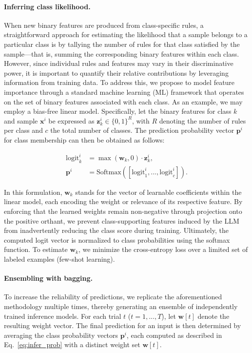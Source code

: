 \paragraph{Inferring class likelihood.} When new binary features are produced from class-specific rules, a straightforward approach for estimating the likelihood that a sample belongs to a particular class is by tallying the number of rules for that class satisfied by the sample—that is, summing the corresponding binary features within each class. However, since individual rules and features may vary in their discriminative power, it is important to quantify their relative contributions by leveraging information from training data. To address this, we propose to model feature importance through a standard machine learning (ML) framework that operates on the set of binary features associated with each class. As an example, we may employ a bias-free linear model. Specifically, let the binary features for class $k$ and sample $\mathbf{x}^i$ be expressed as $\mathbf{z}_k^i \in \{0, 1\}^R$, with $R$ denoting the number of rules per class and $c$ the total number of classes. The prediction probability vector $\mathbf{p}^i$ for class membership can then be obtained as follows:

\begin{align}
\text{logit}_k^i &= \max(\mathbf{w}_k, 0) \cdot \mathbf{z}_k^i, \nonumber \\
\mathbf{p}^i &= \text{Softmax}({[\text{logit}_{1}^i, ..., \text{logit}_{c}^i]}). \label{eq:infer_prob}
\end{align}

In this formulation, $\mathbf{w}_k$ stands for the vector of learnable coefficients within the linear model, each encoding the weight or relevance of its respective feature. By enforcing that the learned weights remain non-negative through projection onto the positive orthant, we prevent class-supporting features induced by the LLM from inadvertently reducing the class score during training. Ultimately, the computed logit vector is normalized to class probabilities using the softmax function. To estimate $\mathbf{w}_k$, we minimize the cross-entropy loss over a limited set of labeled examples (few-shot learning).

\vspace*{-0.12in}
\paragraph{Ensembling with bagging.} To increase the reliability of predictions, we replicate the aforementioned methodology multiple times, thereby generating an ensemble of independently trained inference models. For each trial $t$ ($t=1, ..., T$), let $\mathbf{w}[t]$ denote the resulting weight vector. The final prediction for an input is then determined by averaging the class probability vectors $\mathbf{p}^i$, each computed as described in Eq.~\ref{eq:infer_prob} with a distinct weight set $\mathbf{w}[t]$.

